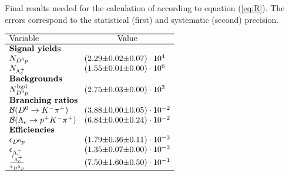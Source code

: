  
\begin{table}[h]
    \centering
    \caption{Final results needed for the calculation of \R according to equation (\ref{eq:R}). The errors correspond to the statistical (first) and systematic (second) precision.}
    \label{tab:table_finalresults.tex}
    $\begin{array}{lr@{\pm}r@{\pm}l}
    \hline
    \text{Variable} & \multicolumn{3}{c}{\text{Value}} \\
    \hline
\multicolumn{4}{l}{\text{\textbf{Signal yields}}} \\
\NDp&(2.29 & 0.02 & 0.07) \cdot 10^{4}\\
\NLc&(1.55 & 0.01 & 0.00) \cdot 10^{6}\\
\multicolumn{4}{l}{\text{\textbf{Backgrounds}}} \\
\NBgdDp&(2.75 & 0.03 & 0.00) \cdot 10^{3}\\
\multicolumn{4}{l}{\text{\textbf{Branching ratios}}} \\
\DBFDp&(3.88 & 0.00 & 0.05) \cdot 10^{-2}\\
\DBFLc&(6.84 & 0.00 & 0.24) \cdot 10^{-2}\\
\multicolumn{4}{l}{\text{\textbf{Efficiencies}}} \\
\effDp&(1.79 & 0.36 & 0.11) \cdot 10^{-3}\\
\effLc&(1.35 & 0.07 & 0.00) \cdot 10^{-3}\\
\frac{\effLc}{\effDp}&(7.50 & 1.60 & 0.50) \cdot 10^{-1}\\

    \hline
    \end{array}$
\end{table}
